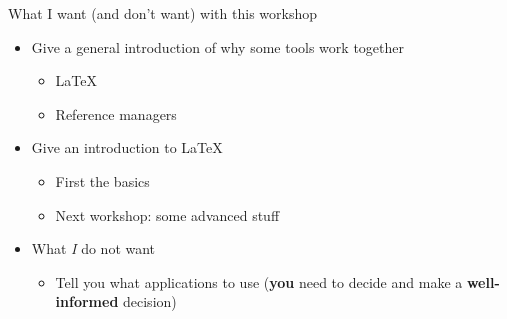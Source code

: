 \documentclass[ignorenonframetext]{beamer}
\begin{document}
\begin{frame}{What I want (and don't want) with this workshop}

\begin{itemize}
\item
  Give a general introduction of why some tools work together

  \begin{itemize}
  \item
   \LaTeX{}
  \item
    Reference managers
  \end{itemize}
\item
  Give an introduction to \LaTeX{}

  \begin{itemize}
  \item
    First the basics
  \item
    Next workshop: some advanced stuff
  \end{itemize}
\item
  What \emph{I} do not want

  \begin{itemize}
  \item
    Tell you what applications to use (\textbf{you} need to decide and make a \textbf{well-informed} decision)
  \end{itemize}
\end{itemize}

\end{frame}
\end{document}
